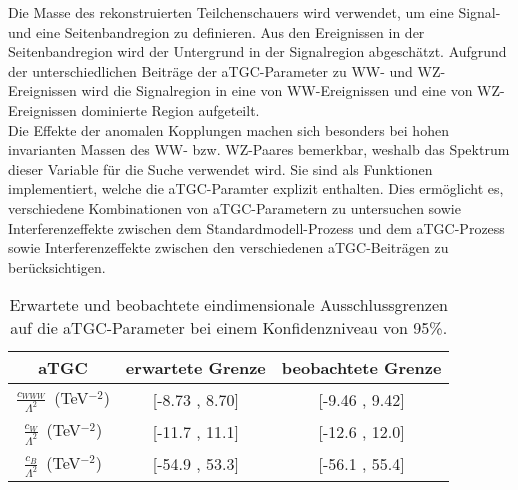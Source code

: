 Die Masse des rekonstruierten Teilchenschauers wird verwendet, um eine Signal- und eine Seitenbandregion zu  definieren. Aus den Ereignissen in der Seitenbandregion wird der Untergrund in der Signalregion abgeschätzt. Aufgrund der unterschiedlichen Beiträge der aTGC-Parameter zu WW- und WZ-Ereignissen wird die Signalregion in eine von WW-Ereignissen und eine von WZ-Ereignissen dominierte Region aufgeteilt. \\

Die Effekte der anomalen Kopplungen machen sich besonders bei hohen invarianten Massen des WW- bzw. WZ-Paares bemerkbar, weshalb das Spektrum dieser Variable für die Suche verwendet wird. Sie sind als Funktionen implementiert, welche die aTGC-Paramter explizit enthalten. Dies ermöglicht es, verschiedene Kombinationen von aTGC-Parametern zu untersuchen sowie Interferenzeffekte zwischen dem Standardmodell-Prozess und dem aTGC-Prozess sowie Interferenzeffekte zwischen den verschiedenen aTGC-Beiträgen zu berücksichtigen.\\

\begin{table}
	\centering
	\caption[Erwartete und beobachtete Ausschlussgrenzen bei einem Konfidenzniveau von 95\%]{Erwartete und beobachtete eindimensionale Ausschlussgrenzen auf die aTGC-Parameter bei einem Konfidenzniveau von 95\%.}
	\label{tab:intro_ger:1d}
	\begin{tabular}{ccc}
	\hline
	aTGC              &     erwartete Grenze & beobachtete Grenze\\
	\hline
	$\frac{c_{WWW}}{\Lambda ^2}$~(TeV$^{-2}$) &  [-8.73 , 8.70] &  [-9.46 , 9.42] \\
	$\frac{c_{W}}{\Lambda ^2}$~(TeV$^{-2}$)   &  [-11.7 , 11.1] &  [-12.6 , 12.0] \\
	$\frac{c_{B}}{\Lambda ^2}$~(TeV$^{-2}$)   & [-54.9 , 53.3] &  [-56.1 , 55.4] \\
	\hline
	\end{tabular}
\end{table}

